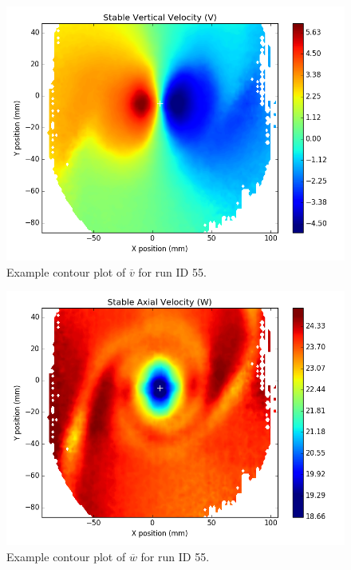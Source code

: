 {\begin{figure}[H]
	\centering
	\includegraphics[width=5in]{figs/example_vortex_figs/example_V_contour}
\caption{Example contour plot of $\overline{v}$ for run ID 55.}
\label{fig:examp_V}
\end{figure}

\begin{figure}[H]
	\centering
	\includegraphics[width=5in]{figs/example_vortex_figs/example_W_contour}
\caption{Example contour plot of $\overline{w}$ for run ID 55.}
\label{fig:examp_W}
\end{figure}

}
